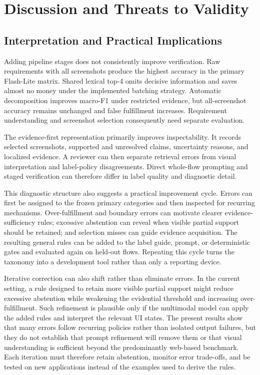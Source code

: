 \chapter{Discussion and Threats to Validity}\label{discussion-and-threats-to-validity}

\section{Interpretation and Practical Implications}\label{interpretation-and-practical-implications}

Adding pipeline stages does not consistently improve verification. Raw
requirements with all screenshots produce the highest accuracy in the primary
Flash-Lite matrix. Shared lexical top-4 omits decisive information and saves almost no
money under the implemented batching strategy. Automatic decomposition
improves macro-F1 under restricted evidence, but all-screenshot accuracy remains
unchanged and false fulfillment increases. Requirement understanding and
screenshot selection consequently need separate evaluation.

The evidence-first representation primarily improves inspectability. It records
selected screenshots, supported and unresolved claims, uncertainty reasons, and
localized evidence. A reviewer can then separate retrieval errors from visual
interpretation and label-policy disagreements. Direct whole-flow prompting and
staged verification can therefore differ in label quality and diagnostic
detail.

This diagnostic structure also suggests a practical improvement cycle. Errors
can first be assigned to the frozen primary categories and then inspected for
recurring mechanisms. Over-fulfillment and boundary errors can motivate clearer
evidence-sufficiency rules; excessive abstention can reveal when visible partial
support should be retained; and selection misses can guide evidence acquisition.
The resulting general rules can be added to the label guide, prompt, or
deterministic gates and evaluated again on held-out flows. Repeating this cycle
turns the taxonomy into a development tool rather than only a reporting device.

Iterative correction can also shift rather than eliminate errors. In the current
setting, a rule designed to retain more visible partial support might reduce
excessive abstention while weakening the evidential threshold and increasing
over-fulfillment. Such refinement is plausible only if the multimodal model can
apply the added rules and interpret the relevant UI states. The present results
show that many errors follow recurring policies rather than isolated output
failures, but they do not establish that prompt refinement will remove them or
that visual understanding is sufficient beyond the predominantly web-based
benchmark. Each iteration must therefore retain abstention, monitor error
trade-offs, and be tested on new applications instead of the examples used to
derive the rules.


